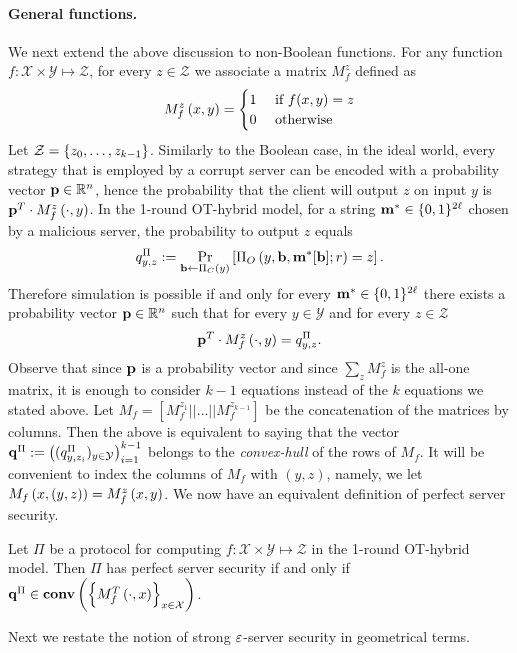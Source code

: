 \documentclass{llncs}
\newcommand{\X}{\mathcal{X}}
\newcommand{\Y}{\mathcal{Y}}
\renewcommand{\Z}{\mathcal{Z}}
\newcommand{\CH}[1]{\normalfont{\mathbf{conv}\of{#1}}}
\newcommand{\p}{\myvec{p}}
\renewcommand{\q}{\myvec{q}}
\renewcommand{\b}{\myvec{b}}
\newcommand{\m}{\myvec{m}}
\begin{document}
\paragraph{General functions.}
We next extend the above discussion to non-Boolean functions. For any function $f:\X\times\Y\mapsto\Z$, for every $z\in\Z$ we associate a matrix $M_f^{z}$ defined as 
$$
M_f^z\left ( x,y \right )=
\begin{cases}
1&\text{ if }f(x,y)=z\\
0&\text{ otherwise}
\end{cases}
$$
Let $\Z=\set{z_0,\ldots,z_{k-1}}$. Similarly to the Boolean case, in the ideal world, every strategy that is employed by a corrupt server can be encoded with a probability vector $\p\in\R^{n}$, hence the probability that the client will output $z$ on input $y$ is $\p^T\cdot M_f^z\of{\cdot,y}$. In the 1-round OT-hybrid model, for a string ${\bf m}^*\in\{0,1\}^{2\ell}$ chosen by a malicious server, the probability to output $z$ equals
$$q^{\Pi}_{y,z}:=\Pr_{\b\from\Pi_C\of{y}}\left[\Pi_O\of{y,\b,\m^*[\b];r}=z\right].$$ 
Therefore simulation is possible if and only for every $\m^*\in\zo^{2\ell}$ there exists a probability vector $\p\in\R^n$ such that for every $y\in\Y$ and for every $z\in\Z$
$$\p^T\cdot M^z_f\of{\cdot,y}=q^{\Pi}_{y,z}.$$
Observe that since $\p$ is a probability vector and since $\sum_z M_f^z$ is the all-one matrix, it is enough to consider $k-1$ equations instead of the $k$ equations we stated above. Let $M_f=\left[M_f^{z_1}||\ldots||M_f^{z_{k-1}}\right]$ be the concatenation of the matrices by columns. Then the above is equivalent to saying that the vector $\q^{\Pi}:=\left((q^{\Pi}_{y,z_i})_{y\in\Y}\right)_{i=1}^{k-1}$ belongs to the \emph{convex-hull} of the rows of $M_f$. It will be convenient to index the columns of $M_f$ with $(y,z)$, namely, we let $M_f\left ( x,(y,z) \right )=M_f^z\left ( x,y \right )$. We now have an equivalent definition of perfect server security.

\begin{lemma}
Let $\Pi$ be a protocol for computing $f:\X\times\Y\mapsto\Z$ in the 1-round OT-hybrid model. Then $\Pi$ has perfect server security if and only if $\q^{\Pi}\in\CH{\set{M_f^T\of{\cdot,x}}_{x\in\X}}$.
\end{lemma}

Next we restate the notion of strong $\varepsilon$-server security in geometrical terms.
\end{document}

